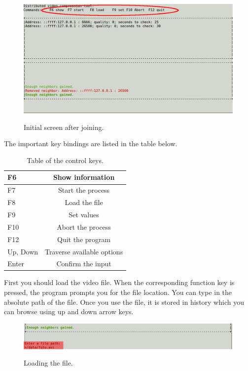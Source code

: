 \begin{figure}[h]
\begin{center}
\includegraphics[scale=0.35]{./img/init-screen.pdf}
\label{initial-screen}
\caption[initial-screen]{Initial screen after joining.}
\end{center}
\end{figure}

The important key bindings are listed in the table below.

\begin{table}[h]
\begin{center}
 \begin{tabular}{ | l | c |}
   \hline
   F6 & Show information \\ \hline
   F7 & Start the process \\ \hline
   F8 & Load the file \\ \hline
   F9 & Set values \\ \hline
   F10 & Abort the process \\ \hline
   F12 & Quit the program \\ \hline
   Up, Down & Traverse available options \\ \hline
   Enter & Confirm the input \\
    \hline
 \end{tabular}
 \caption{Table of the control keys.}
 \end{center}
\end{table}

First you should load the video file. When the corresponding function
key is pressed, the program prompts you for the file location. You can
type in the absolute path of the file. Once you use the file, it is
stored in history which you can browse using up and down arrow keys.

\begin{figure}[h]
\begin{center}
\includegraphics[scale=0.35]{./img/loading.pdf}
\label{loading-files}
\caption{Loading the file.}
\end{center}
\end{figure}

